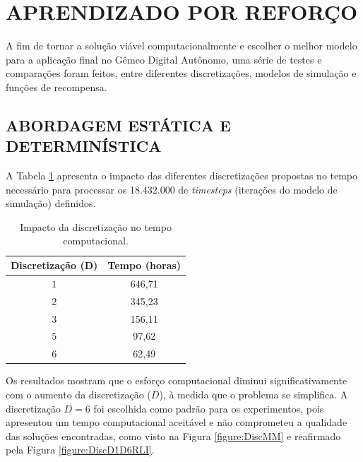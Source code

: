 \documentclass[
    12pt,                %
    openright,           %
    oneside,             %
    a4paper,             %
    english,             %
    spanish,             %
    brazil               %
]{ufscar}
\begin{document}
\section{APRENDIZADO POR REFORÇO}

A fim de tornar a solução viável computacionalmente e escolher o melhor modelo para a aplicação final no Gêmeo Digital Autônomo, uma série de testes e comparações foram feitos, entre diferentes discretizações, modelos de simulação e funções de recompensa.

\subsection{ABORDAGEM ESTÁTICA E DETERMINÍSTICA}

A Tabela \ref{tab:discretizacao} apresenta o impacto das diferentes discretizações propostas no tempo necessário para processar os 18.432.000 de \textit{timesteps} (iterações do modelo de simulação) definidos.

\begin{table}[htp]
    \centering
    \caption{Impacto da discretização no tempo computacional.}
    \begin{tabular}{c c}
    \toprule
    Discretização (D) & Tempo (horas) \\
    \midrule
    \(1\) & 646,71 \\
    \(2\) & 345,23 \\
    \(3\) & 156,11 \\
    \(5\) & 97,62  \\
    \(6\) & 62,49  \\
    \bottomrule
    \end{tabular}
    \label{tab:discretizacao}
\end{table}

Os resultados mostram que o esforço computacional diminui significativamente com o aumento da discretização (\(D\)), à medida que o problema se simplifica. A discretização \(D=6\) foi escolhida como padrão para os experimentos, pois apresentou um tempo computacional aceitável e não comprometeu a qualidade das soluções encontradas, como visto na Figura \ref{figure:DiscMM} e reafirmado pela Figura \ref{figure:DiscD1D6RLI}.
\end{document}
